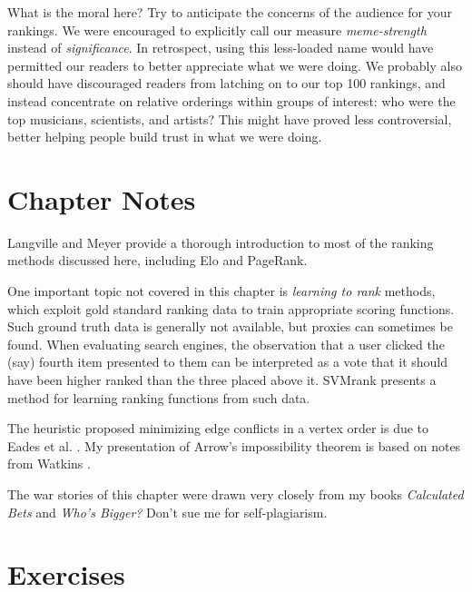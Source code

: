 \documentclass[10pt]{article}
\begin{document}
What is the moral here? Try to anticipate the concerns of the audience for your rankings. We were encouraged to explicitly call our measure \textit{meme-strength} instead of \textit{significance}. In retrospect, using this less-loaded name would have permitted our readers to better appreciate what we were doing. We probably also should have discouraged readers from latching on to our top 100 rankings, and instead concentrate on relative orderings within groups of interest: who were the top musicians, scientists, and artists? This might have proved less controversial, better helping people build trust in what we were doing.

\section{Chapter Notes}
Langville and Meyer \cite{LM12} provide a thorough introduction to most of the ranking methods discussed here, including Elo and PageRank.

One important topic not covered in this chapter is \textit{learning to rank} methods, which exploit gold standard ranking data to train appropriate scoring functions. Such ground truth data is generally not available, but proxies can sometimes be found. When evaluating search engines, the observation that a user clicked the (say) fourth item presented to them can be interpreted as a vote that it should have been higher ranked than the three placed above it. SVMrank \cite{Joa02} presents a method for learning ranking functions from such data.

The heuristic proposed minimizing edge conflicts in a vertex order is due to Eades et al. \cite{ELS93}. My presentation of Arrow's impossibility theorem is based on notes from Watkins \cite{Wat16}.

The war stories of this chapter were drawn very closely from my books \textit{Calculated Bets} and \textit{Who’s Bigger?} Don't sue me for self-plagiarism.

\section{Exercises}
\end{document}
